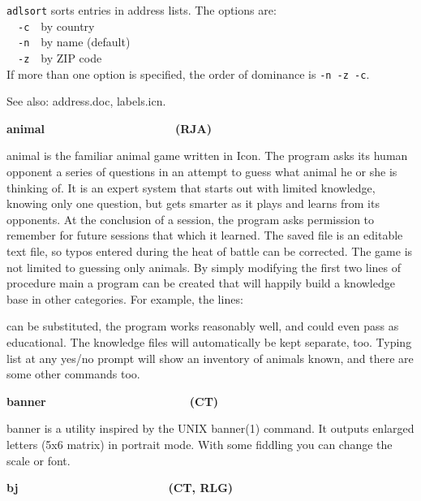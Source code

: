 \texttt{adlsort} sorts entries in address lists. The options
are:\\
\ \ \texttt{{}-c}\ \ by country\\
\ \ \texttt{{}-n}\ \ by name (default)\\
\ \ \texttt{{}-z}\ \ by ZIP code\\
If more than one option is specified, the order of dominance is
\texttt{{}-n -z -c}.

See also: address.doc, labels.icn.

{\sffamily\bfseries
animal\ \ \ \ \ \ \ \ \ \ \ \ \ \ \ \ \ \ \ \ (RJA)}

\textsf{animal} is the familiar {\textquotedbl}animal
game{\textquotedbl} written in Icon. The program asks its human
opponent a series of questions in an attempt to guess what animal he or
she is thinking of. It is an {\textquotedbl}expert
system{\textquotedbl} that starts out with limited knowledge, knowing
only one question, but gets smarter as it plays and learns from its
opponents. At the conclusion of a session, the program asks permission
to remember for future sessions that which it learned. The saved file
is an editable text file, so typos entered during the heat of battle
can be corrected. The game is not limited to guessing only animals. By
simply modifying the first two lines of procedure
{\textquotedbl}main{\textquotedbl} a program can be created that will
happily build a knowledge base in other categories. For example, the
lines:


can be substituted, the program works reasonably well, and could even
pass as educational. The knowledge files will automatically be kept
separate, too. Typing {\textquotedbl}list{\textquotedbl} at any yes/no
prompt will show an inventory of animals known, and there are some
other commands too. 

{\sffamily\bfseries
banner\ \ \ \ \ \ \ \ \ \ \ \ \ \ \ \ \ \ \ \  \ \ (CT)}

\textsf{banner} is a utility inspired by the UNIX \textsf{banner(1)}
command. It outputs enlarged letters (5x6 matrix) in portrait mode.
With some fiddling you can change the scale or font. 

{\sffamily\bfseries
bj\ \ \ \ \ \ \ \ \ \ \ \ \ \ \ \ \ \ \ \  \ \ \ (CT, RLG)}

